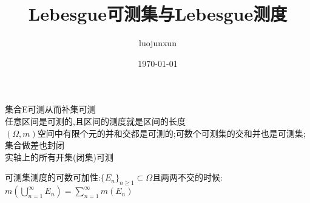\documentclass[12pt, a4paper, oneside]{ctexart}
\title{\huge\textbf{Lebesgue可测集与Lebesgue测度}}
\author{luojunxun}
\date{\today}
\begin{document}
\maketitle
集合E可测从而补集可测\\
任意区间是可测的,且区间的测度就是区间的长度\\
$(\Omega,m)$空间中有限个元的并和交都是可测的;可数个可测集的交和并也是可测集;集合做差也封闭\\
实轴上的所有开集(闭集)可测\\

可测集测度的可数可加性:$\{E_n\}_{n\geq 1}\subset\Omega$且两两不交的时候:$m(\bigcup\limits_{n=1}^\infty E_n)=\sum\limits_{n=1}^\infty m(E_n)$\\























% 
% 
\end{document}
